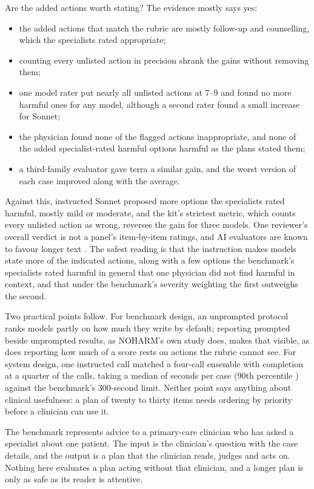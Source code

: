 \documentclass[11pt]{article}
\begin{document}
Are the added actions worth stating? The evidence mostly says yes:
\begin{itemize}
\item the added actions that match the rubric are mostly follow-up and counselling, which the
specialists rated appropriate;
\item counting every unlisted action in precision shrank the gains without removing them;
\item one model rater put nearly all unlisted actions at 7--9 and found no more harmful ones for any
model, although a second rater found a small increase for Sonnet;
\item the physician found none of the flagged actions inappropriate, and none of the added
specialist-rated harmful options harmful as the plans stated them;
\item a third-family evaluator gave terra a similar gain, and the worst version of each case improved
along with the average.
\end{itemize}
Against this, instructed Sonnet proposed more options the specialists rated harmful, mostly mild or
moderate, and the kit's strictest metric, which counts every unlisted action as wrong, reverses the
gain for three models. One reviewer's overall verdict is not a panel's item-by-item ratings, and AI
evaluators are known to favour longer text \citep{zheng2023judging,saito2023verbosity,dubois2024length}.
The safest reading is that the instruction makes models state more of the indicated actions, along
with a few options the benchmark's specialists rated harmful in general that one physician did not
find harmful in context, and that under the benchmark's severity weighting the first outweighs the
second.

Two practical points follow. For benchmark design, an unprompted protocol ranks models partly on how
much they write by default; reporting prompted beside unprompted results, as NOHARM's own study does,
makes that visible, as does reporting how much of a score rests on actions the rubric cannot see. For
system design, one instructed call matched a four-call ensemble with completion at a quarter of the
calls, taking a median of \covRuntimeTerraSpec{} seconds per case (90th percentile
\covRuntimePninetyTerraSpec{}) against the benchmark's 300-second limit. Neither point says anything
about clinical usefulness: a plan of twenty to thirty items needs ordering by priority before a
clinician can use it.

The benchmark represents advice to a primary-care clinician who has asked a specialist about one
patient. The input is the clinician's question with the case details, and the output is a plan that
the clinician reads, judges and acts on. Nothing here evaluates a plan acting without that clinician,
and a longer plan is only as safe as its reader is attentive.
\end{document}
